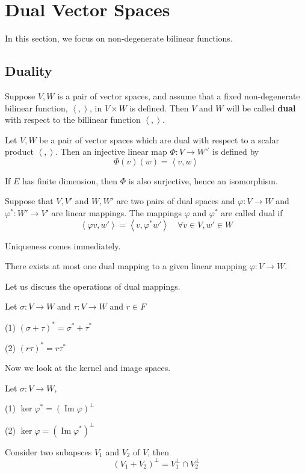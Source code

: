 \section{Dual Vector Spaces}
In this section, we focus on non-degenerate bilinear functions.
\subsection{Duality}
\begin{definition}
Suppose $V,W$ is a pair of vector spaces, and assume that a fixed non-degenerate bilinear function, $\left\langle,\right\rangle$, in $V\times W$ is defined. Then $V$ and $W$ will be called \textbf{dual} with respect to the billinear function $\left\langle,\right\rangle$. 
\end{definition}
\begin{theorem}\label{general dual v.s. special dual}
Let $V,W$ be a pair of vector spaces which are dual with respect to a scalar product $\left\langle,\right\rangle$. Then an injective linear map $\Phi : V \longrightarrow W^\vee$ is defined by \[\Phi(v)(w)=\left\langle v,w\right\rangle\]
\end{theorem}
\begin{remark}
If $E$ has finite dimension, then $\Phi$ is also surjective, hence an isomorphism.
\end{remark}

\begin{definition}
Suppose that $V,V'$ and $W,W'$ are two pairs of dual spaces and $\varphi:V\to W$ and $\varphi^*:W'\to V'$ are linear mappings. The mappings $\varphi$ and $\varphi^*$ are called dual if \[\left\langle \varphi v,w'\right\rangle=\left\langle v,\varphi^* w'\right\rangle \quad \forall v\in V,w'\in W\]
\end{definition}
Uniqueness comes immediately.
\begin{theorem}
There exists at most one dual mapping to a given linear mapping $\varphi:V\to W$.
\end{theorem}
Let us discuss the operations of dual mappings.
\begin{theorem}
Let $\sigma:V\to W$ and $\tau:V\to W$ and $r\in F$\par
(1) $(\sigma+\tau)^*=\sigma^*+\tau^*$\par
(2) $(r\tau)^*=r\tau^*$
\end{theorem}
Now we look at the kernel and image spaces.
\begin{theorem}
Let $\sigma:V\to W$,\par
(1) $\ker \varphi^*=(\operatorname{Im}\varphi)^\perp$ \par
(2) $\ker \varphi=(\operatorname{Im}\varphi^*)^\perp $
\end{theorem}
\begin{theorem}
Consider two subapsces $V_1$ and $V_2$ of $V$, then \[ (V_1+V_2)^\perp=V_1^\perp\cap V_2^\perp\]
\end{theorem}
